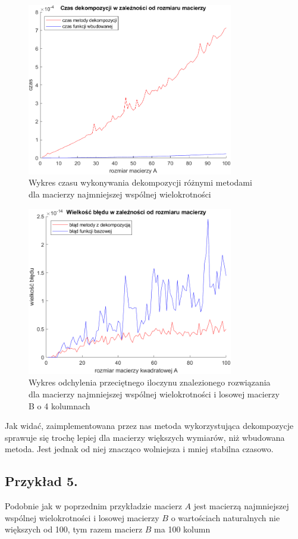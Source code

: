 \documentclass{article}
\begin{document}
\begin{figure}[!ht]
\centering
  \centering
  \includegraphics[width=9cm]{wykresy/przyklad4_1.png}
  \caption{Wykres czasu wykonywania dekompozycji różnymi metodami\\
  dla macierzy najmniejszej wspólnej wielokrotności }
  \label{fig:sub1}
\label{fig:test}
\end{figure}


\begin{figure}[!ht]
\centering
  \centering
  \includegraphics[width=9cm]{wykresy/przyklad4.png}
  \caption{Wykres odchylenia przeciętnego iloczynu znalezionego rozwiązania \\
  dla macierzy najmniejszej wspólnej wielokrotności i losowej macierzy B o 4 kolumnach}
  \label{fig:sub1}
\label{fig:test}
\end{figure}

Jak widać, zaimplementowana przez nas metoda wykorzystująca dekompozycje sprawuje się trochę lepiej dla macierzy większych wymiarów, niż wbudowana metoda. Jest jednak od niej znacząco wolniejsza i mniej stabilna czasowo.


\subsection*{Przykład 5.}
Podobnie jak w poprzednim przykładzie macierz $A$ jest macierzą najmniejszej wspólnej wielokrotności i losowej macierzy $B$ o wartościach naturalnych nie większych od 100, tym razem macierz $B$ ma 100 kolumn
\end{document}
